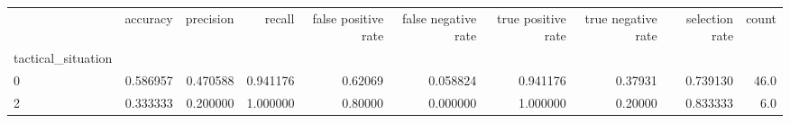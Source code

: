 \begin{tabular}{lrrrrrrrrr}
\toprule
{} &  accuracy &  precision &    recall &  false positive rate &  false negative rate &  true positive rate &  true negative rate &  selection rate &  count \\
tactical\_situation &           &            &           &                      &                      &                     &                     &                 &        \\
\midrule
0                  &  0.586957 &   0.470588 &  0.941176 &              0.62069 &             0.058824 &            0.941176 &             0.37931 &        0.739130 &   46.0 \\
2                  &  0.333333 &   0.200000 &  1.000000 &              0.80000 &             0.000000 &            1.000000 &             0.20000 &        0.833333 &    6.0 \\
\bottomrule
\end{tabular}
